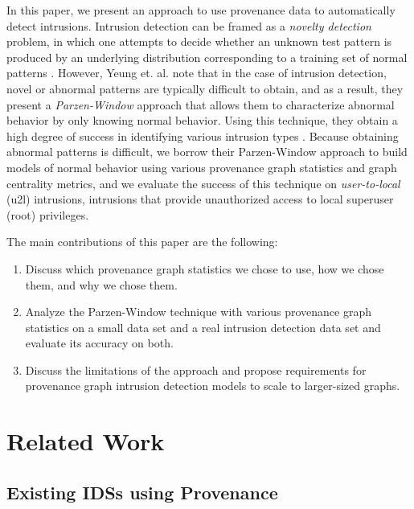 \documentclass[10pt,twocolumn]{article}
\begin{document}
In this paper, we present an approach to use provenance data to automatically detect intrusions. Intrusion
detection can be framed as a {\em novelty detection} problem, in which one attempts to decide whether
an unknown test pattern is produced by an underlying distribution corresponding to a training set
of normal patterns \cite{parzen}. However, Yeung et. al. note that in the case of intrusion detection, novel
or abnormal patterns are typically difficult to obtain, and as a result, they present a {\em Parzen-Window} approach that allows them to characterize abnormal behavior by only knowing normal behavior.
Using this technique, they obtain a high degree of success
in identifying various intrusion types \cite{parzen}. Because obtaining abnormal patterns is difficult, 
we borrow their Parzen-Window approach to build models of normal behavior using 
various provenance graph statistics and graph centrality metrics, and we evaluate the success of this technique
on {\em user-to-local} (u2l) intrusions, intrusions that provide unauthorized access to local superuser (root) privileges.

The main contributions of this paper are the following:
\begin{enumerate}
\item Discuss which provenance graph statistics we chose to use, how we chose them, and why we chose them.
\item Analyze the Parzen-Window technique with various provenance graph statistics on a small data set and a real intrusion detection data set and evaluate its accuracy on both.
\item Discuss the limitations of the approach and propose requirements for provenance graph intrusion detection models to scale to larger-sized graphs.
\end{enumerate}


%

\section{Related Work}

\subsection{Existing IDSs using Provenance}
\end{document}
